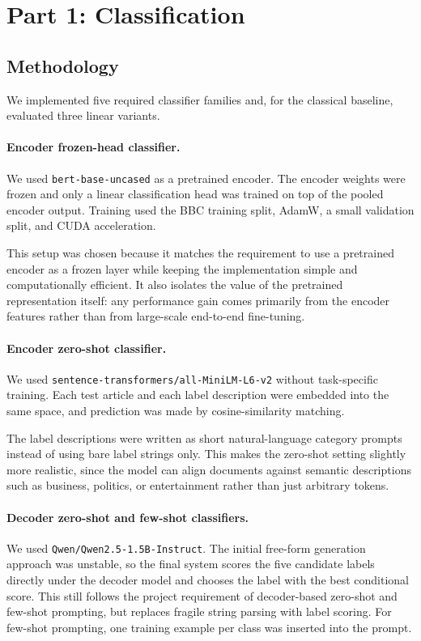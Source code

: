 \documentclass{article}
\begin{document}
\section{Part 1: Classification}

\subsection{Methodology}

We implemented five required classifier families and, for the classical baseline, evaluated three linear variants.

\paragraph{Encoder frozen-head classifier.}
We used \texttt{bert-base-uncased} as a pretrained encoder. The encoder weights were frozen and only a linear classification head was trained on top of the pooled encoder output. Training used the BBC training split, AdamW, a small validation split, and CUDA acceleration.

This setup was chosen because it matches the requirement to use a pretrained encoder as a frozen layer while keeping the implementation simple and computationally efficient. It also isolates the value of the pretrained representation itself: any performance gain comes primarily from the encoder features rather than from large-scale end-to-end fine-tuning.

\paragraph{Encoder zero-shot classifier.}
We used \texttt{sentence-transformers/all-MiniLM-L6-v2} without task-specific training. Each test article and each label description were embedded into the same space, and prediction was made by cosine-similarity matching.

The label descriptions were written as short natural-language category prompts instead of using bare label strings only. This makes the zero-shot setting slightly more realistic, since the model can align documents against semantic descriptions such as business, politics, or entertainment rather than just arbitrary tokens.

\paragraph{Decoder zero-shot and few-shot classifiers.}
We used \texttt{Qwen/Qwen2.5-1.5B-Instruct}. The initial free-form generation approach was unstable, so the final system scores the five candidate labels directly under the decoder model and chooses the label with the best conditional score. This still follows the project requirement of decoder-based zero-shot and few-shot prompting, but replaces fragile string parsing with label scoring. For few-shot prompting, one training example per class was inserted into the prompt.
\end{document}

